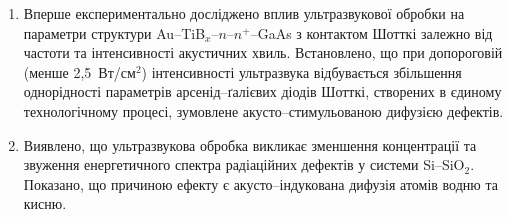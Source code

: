 \begin{enumerate}[leftmargin=0cm,itemindent=3em]
\item Вперше експериментально досліджено вплив ультразвукової обробки на параметри структури Au--TiB$_x$--$n$--$n^+$--GaAs з контактом Шотткі
 залежно від частоти та інтенсивності акустичних хвиль.
 Встановлено, що при допороговій (менше 2,5~Вт/см$^2$) інтенсивності ультразвука відбувається збільшення однорідності параметрів арсенід--ґалієвих діодів Шотткі, створених в єдиному технологічному процесі, зумовлене
 акусто--стимульованою дифузією  дефектів.



\item Виявлено, що  ультразвукова обробка викликає зменшення концентрації та звуження енергетичного спектра радіаційних дефектів у системи   Si--SiO$_2$.
    Показано, що причиною ефекту є акусто--індукована дифузія атомів водню та кисню.

\end{enumerate}

